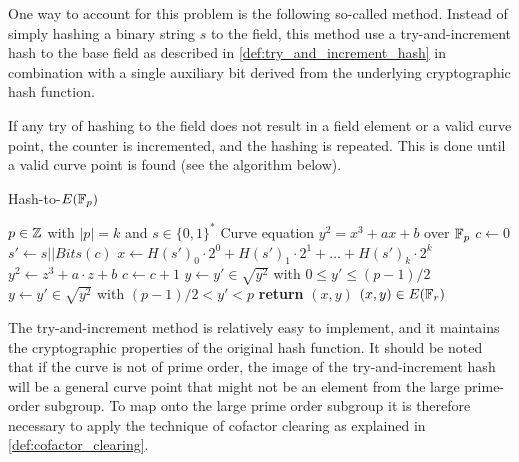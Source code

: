 One way to account for this problem is the following so-called  method. Instead of simply hashing a binary string $s$ to the field, this method use a try-and-increment hash to the base field as described in \ref{def:try_and_increment_hash} in combination with a single auxiliary bit derived from the underlying cryptographic hash function.

If any try of hashing to the field does not result in a field element or a valid curve point, the counter is incremented, and the hashing is repeated. This is done until a valid curve point is found (see the algorithm below).

\begin{algorithm}\label{alg:hash-to-e}\caption{Hash-to-$E(\mathbb{F}_p)$}
\begin{algorithmic}[0]
\Require $p \in \mathbb{Z}$ with $|p|=k$ and $s\in\{0,1\}^*$
\Require Curve equation $y^2 = x^3 + ax +b$ over $\mathbb{F}_p$
\State $c \gets 0$	
\Repeat
\State $s' \gets s||Bits(c)$
\State $x \gets H(s')_0\cdot 2^0 + H(s')_1\cdot 2^1 + \ldots + H(s')_{k}\cdot 2^{k}$ 
\State $y^2 \gets z^3 + a\cdot z + b$ 
\State $c\gets c+1$
 
 
\State $y \gets y'\in \sqrt{y^2}$ with $0\leq y' \leq (p-1)/2$
\Else 
\State $y \gets y'\in \sqrt{y^2}$ with $(p-1)/2 < y' < p$
\EndIf
\State \textbf{return} $(x,y)$
\EndProcedure
\Ensure $(x,y)\in E(\mathbb{F}_r)$
\end{algorithmic}
\end{algorithm}

The try-and-increment method is relatively easy to implement, and it maintains the cryptographic properties of the original hash function. It should be noted that if the curve is not of prime order, the image of the try-and-increment hash will be a general curve point that might not be an element from the large prime-order subgroup. To map onto the large prime order subgroup it is therefore necessary to apply the technique of cofactor clearing as explained in \ref{def:cofactor_clearing}.

